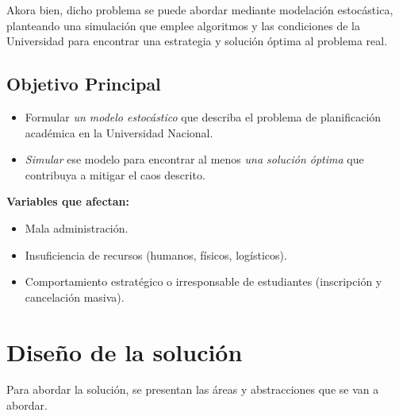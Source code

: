 \documentclass{article}
\begin{document}
Akora bien, dicho problema se puede abordar mediante modelación estocástica, planteando una simulación 
que emplee algoritmos y las condiciones de la Universidad para encontrar una estrategia y solución 
óptima al problema real.

\subsection{Objetivo Principal}

\begin{itemize}
  \item Formular \textit{un modelo estocástico} que describa el problema de planificación académica 
        en la Universidad Nacional.
  \item \textit{Simular} ese modelo para encontrar al menos \textit{una solución óptima} 
        que contribuya a mitigar el caos descrito.
\end{itemize}

\textbf{Variables que afectan:}

\begin{itemize}
  \item Mala administración.
  \item Insuficiencia de recursos (humanos, físicos, logísticos).
  \item Comportamiento estratégico o irresponsable de estudiantes (inscripción y cancelación masiva).
\end{itemize}


\section{Diseño de la solución}\label{sec:dis}

Para abordar la solución, se presentan las áreas y abstracciones que se van a abordar.
\end{document}

